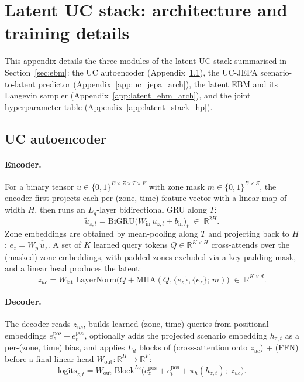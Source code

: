 \documentclass{article}
\begin{document}

\section{Latent UC stack: architecture and training details}
\label{app:ebm_details}

This appendix details the three modules of the latent UC stack summarised in Section~\ref{sec:ebm}: the UC autoencoder (Appendix~\ref{app:uc_ae}), the UC-JEPA scenario-to-latent predictor (Appendix~\ref{app:uc_jepa_arch}), the latent EBM and its Langevin sampler (Appendix~\ref{app:latent_ebm_arch}), and the joint hyperparameter table (Appendix~\ref{app:latent_stack_hp}).

\subsection{UC autoencoder}
\label{app:uc_ae}

\paragraph{Encoder.}
For a binary tensor $u \in \{0,1\}^{B \times Z \times T \times F}$ with zone mask $m \in \{0,1\}^{B\times Z}$, the encoder first projects each per-(zone, time) feature vector with a linear map of width $H$, then runs an $L_g$-layer bidirectional GRU along $T$:
\begin{equation}
\tilde u_{z,t} = \mathrm{BiGRU}\bigl(W_{\mathrm{in}}\,u_{z,t} + b_{\mathrm{in}}\bigr)_t \;\in\; \mathbb{R}^{2H}.
\end{equation}
Zone embeddings are obtained by mean-pooling along $T$ and projecting back to $H$: $e_z = W_p\,\overline{\tilde u}_z$. A set of $K$ learned query tokens $Q \in \mathbb{R}^{K\times H}$ cross-attends over the (masked) zone embeddings, with padded zones excluded via a key-padding mask, and a linear head produces the latent:
\begin{equation}
z_{uc} = W_{\mathrm{lat}}\;\mathrm{LayerNorm}\!\bigl(Q + \mathrm{MHA}(Q, \{e_z\}, \{e_z\};\,m)\bigr) \;\in\; \mathbb{R}^{K \times d}.
\label{eq:uc_ae_enc}
\end{equation}

\paragraph{Decoder.}
The decoder reads $z_{uc}$, builds learned (zone, time) queries from positional embeddings $e_z^{\mathrm{pos}} + e_t^{\mathrm{pos}}$, optionally adds the projected scenario embedding $h_{z,t}$ as a per-(zone, time) bias, and applies $L_d$ blocks of (cross-attention onto $z_{uc}$) + (FFN) before a final linear head $W_{\mathrm{out}}: \mathbb{R}^H \to \mathbb{R}^F$:
\begin{equation}
\mathrm{logits}_{z,t} = W_{\mathrm{out}}\;\mathrm{Block}^{L_d}\!\bigl(e_z^{\mathrm{pos}} + e_t^{\mathrm{pos}} + \pi_h(h_{z,t});\;z_{uc}\bigr).
\label{eq:uc_ae_dec}
\end{equation}
\end{document}
